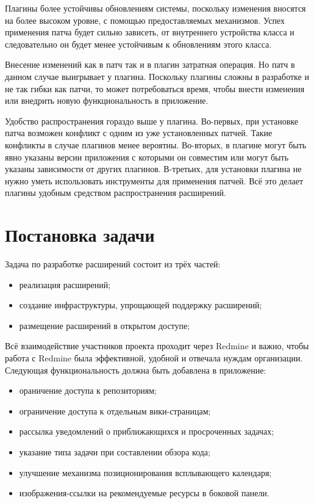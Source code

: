 Плагины более устойчивы обновлениям системы, поскольку изменения вносятся на
более высоком уровне, с помощью предоставляемых механизмов. Успех применения
патча будет сильно зависеть, от внутреннего устройства класса и следовательно
он будет менее устойчивым к обновлениям этого класса.

Внесение изменений как в патч так и в плагин затратная операция. Но патч в
данном случае выигрывает у плагина. Поскольку плагины сложны в разработке и не
так гибки как патчи, то может потребоваться время, чтобы внести изменения или
внедрить новую функциональность в приложение.

Удобство распространения гораздо выше у плагина. Во-первых, при установке патча
возможен конфликт с одним из уже установленных патчей. Такие конфликты в случае
плагинов менее вероятны. Во-вторых, в плагине могут быть явно указаны версии
приложения с которыми он совместим или могут быть указаны зависимости от других
плагинов. В-третьих, для установки плагина не нужно уметь использовать
инструменты для применения патчей. Всё это делает плагины удобным средством
распространения расширений.

\section{Постановка задачи}
Задача по разработке расширений состоит из трёх частей:
\begin{itemize}
  \item реализация расширений;
  \item создание инфраструктуры, упрощающей поддержку расширений;
  \item размещение расширений в открытом доступе;
\end{itemize}
   
Всё взаимодействие участников проекта проходит через Redmine и важно, чтобы
работа с Redmine была эффективной, удобной и отвечала нуждам организации.
Следующая функциональность должна быть добавлена в приложение:
\begin{itemize}
  \item ораничение доступа к репозиториям;
  \item ограничение доступа к отдельным вики-страницам;
  \item рассылка уведомлений о приближающихся и просроченных
  задачах; 
  \item указание типа задачи при составлении обзора кода;
  \item улучшение механизма позиционирования всплывающего календаря;
  \item изображения-ссылки на рекомендуемые ресурсы в боковой панели.
\end{itemize}

